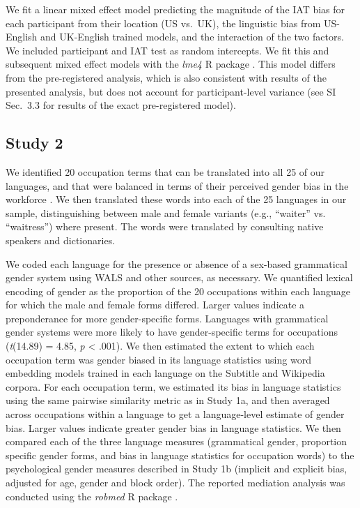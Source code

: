 \documentclass[9pt,twocolumn,twoside]{pnas-new}
\begin{document}
{We fit a linear mixed effect model predicting the magnitude of the IAT bias for each participant from their location (US vs.\ UK), the linguistic bias from US-English and UK-English trained models, and the interaction of the two factors. We included participant and IAT test as random intercepts. We fit this and subsequent mixed effect models with the \emph{lme4} R package \cite{lme4package}. This model differs from the pre-registered analysis, which is also consistent with results of the presented analysis, but does not account for participant-level variance (see SI Sec.\ 3.3 for results of the exact pre-registered model).


\subsection*{Study 2}

We identified 20 occupation terms that can be translated into  all 25 of our languages, and that were balanced in terms of their perceived gender bias in the workforce \cite{misersky2014norms}. We
then translated these words into each of the 25 languages in our sample,
distinguishing between male and female variants (e.g., \enquote{waiter}
vs. \enquote{waitress}) where present. The words were translated by
consulting native speakers and dictionaries.

We coded each language for the presence or absence of a sex-based grammatical gender system using WALS \cite{wals} and other sources, as necessary. We quantified lexical encoding of gender as the proportion of the 20 occupations within each language for which the male and female forms differed. Larger values indicate a preponderance for more gender-specific forms.  Languages with grammatical gender systems were more likely to have gender-specific terms for occupations
(\emph{t}(14.89) = 4.85, \emph{p} \textless{} .001). We then estimated the extent to which each occupation term was gender biased in its language statistics using word
embedding models trained in each language on the Subtitle and Wikipedia
corpora. For each occupation term, we estimated its bias in language
statistics using the same pairwise similarity metric as in Study 1a, and
then averaged across occupations within a language to get a
language-level estimate of gender bias. Larger values indicate greater
gender bias in language statistics. We then compared each of the three
language measures (grammatical gender, proportion specific gender forms,
and bias in language statistics for occupation words) to the
psychological gender measures described in Study 1b (implicit and
explicit bias, adjusted for age, gender and block order). The reported mediation analysis was conducted using the \emph{robmed} R package \cite{robmed}.

}

\showmatmethods{} %

\showacknow{} %


\end{document}
